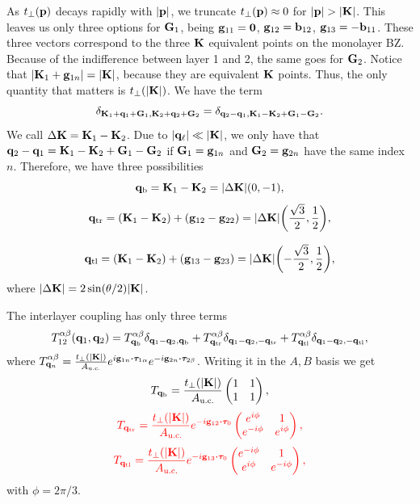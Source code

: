 As $t_\perp({\vb{p}})$ decays rapidly with $\abs{{\vb{p}}}$, we truncate $t_\perp({\vb{p}}) \approx 0$ for $\abs{{\vb{p}}} > \abs{{\vb{K}}}$. This leaves us only three options for ${\vb{G}}_1$, being ${\vb{g}}_{11} = {\vb{0}}$, ${\vb{g}}_{12} = {\vb{b}}_{12}$, ${\vb{g}}_{13} = -{\vb{b}}_{11}$. These three vectors correspond to the three ${\vb{K}}$ equivalent points on the monolayer BZ. Because of the indifference between layer 1 and 2, the same goes for ${\vb{G}}_2$. Notice that $\abs{{\vb{K}}_1+{\vb{g}}_{1n}} = \abs{{\vb{K}}}$, because they are equivalent ${\vb{K}}$ points. Thus, the only quantity that matters is $t_\perp(\abs{{\vb{K}}})$. We have the term
$$
\delta_{{\vb{K}}_1+{\vb{q}}_1+{\vb{G}}_1,{\vb{K}}_2+{\vb{q}}_2+{\vb{G}}_2} = \delta_{{\vb{q}}_2-{\vb{q}}_1,{\vb{K}}_1-{\vb{K}}_2+{\vb{G}}_1-{\vb{G}}_2}.
$$
We call $\Delta{\vb{K}} = {\vb{K}}_1-{\vb{K}}_2$. Due to $\abs{{\vb{q}}_\ell} \ll \abs{{\vb{K}}}$, we only have that ${\vb{q}}_2-{\vb{q}}_1 = {\vb{K}}_1-{\vb{K}}_2+{\vb{G}}_1-{\vb{G}}_2$ if ${\vb{G}}_1 = {\vb{g}}_{1n}$ and ${\vb{G}}_2 = {\vb{g}}_{2n}$ have the same index $n$. Therefore, we have three possibilities
$$
{\vb{q}}_\text{b} = {\vb{K}}_1 - {\vb{K}}_2 = \abs{\Delta {\vb{K}}} \qty(0, -1),
$$
$$
{\vb{q}}_\text{tr} = ({\vb{K}}_1 - {\vb{K}}_2) + ({\vb{g}}_{12} - {\vb{g}}_{22}) = \abs{\Delta {\vb{K}}} \qty(\frac{\sqrt{3}}{2}, \frac{1}{2}),
$$

$$
{\vb{q}}_\text{tl} = ({\vb{K}}_1 - {\vb{K}}_2) + ({\vb{g}}_{13} - {\vb{g}}_{23}) = \abs{\Delta {\vb{K}}} \qty(-\frac{\sqrt{3}}{2}, \frac{1}{2}),
$$
where $\abs{\Delta {\vb{K}}} = 2 \sin(\theta/2) \abs{{\vb{K}}}$.

The interlayer coupling has only three terms
$$
T_{12}^{\alpha\beta}({\vb{q}}_1,{\vb{q}}_2) =
T^{\alpha\beta}_{{\vb{q}}_\text{b}} \delta_{{\vb{q}}_1-{\vb{q}}_2, {\vb{q}}_\text{b}} +
T^{\alpha\beta}_{{\vb{q}}_\text{tr}} \delta_{{\vb{q}}_1-{\vb{q}}_2, -{\vb{q}}_\text{tr}} +
T^{\alpha\beta}_{{\vb{q}}_\text{tl}} \delta_{{\vb{q}}_1-{\vb{q}}_2, -{\vb{q}}_\text{tl}},
$$
where $T^{\alpha\beta}_{\q_n} = \frac{t_\perp(\abs{\K})}{A_{\text{u.c.}}} e^{i \g_{1n} \vdot \bm{\tau}_{1\alpha}}
e^{-i \g_{2n} \vdot \bm{\tau}_{2\beta}}$. Writing it in the $A, B$ basis we get
$$
T_{{\vb{q}}_\text{b}} = \frac{t_\perp(\abs{{\vb{K}}})}{A_{\text{u.c.}}}
\begin{pmatrix}
1 & 1 \\
1 & 1
\end{pmatrix},
$$
$$
\textcolor{red}{
T_{\q_\text{tr}} = \frac{t_\perp(\abs{\K})}{A_{\text{u.c.}}} e^{-i \g_{12} \vdot \vtau_0}
\begin{pmatrix}
e^{i\phi} & 1 \\
e^{-i\phi} & e^{i\phi}
\end{pmatrix},
}
$$
$$
\textcolor{red}{
T_{\q_\text{tl}} = \frac{t_\perp(\abs{\K})}{A_{\text{u.c.}}} e^{-i \g_{13} \vdot \vtau_0}
\begin{pmatrix}
e^{-i\phi} & 1 \\
e^{i\phi} & e^{-i\phi}
\end{pmatrix},
}
$$
with $\phi = 2\pi/3$.



